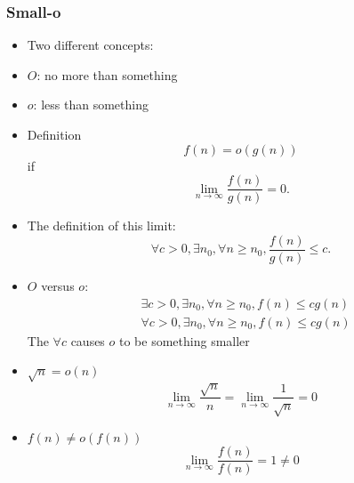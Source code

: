 




\begin{frame}[allowframebreaks] \frametitle{Small-o}
  \begin{itemize}
  \item Two different concepts:

  \item [] $O$: no more than something

  \item [] $o$: less than something
    
\item Definition 
  \begin{equation*}
  f(n)=o(g(n))
\end{equation*}
  if
  \begin{equation*}
    \lim_{n\rightarrow \infty} \frac{f(n)}{g(n)} = 0.
  \end{equation*}
\item The definition of this limit:
\begin{equation*}
  \forall c > 0, \exists n_0, \forall n \geq n_0,
\frac{f(n)}{g(n)} \leq c.
\end{equation*}
\item $O$ versus $o$:
\begin{equation*}
  \begin{split}
&  \exists c > 0, \exists n_0, \forall n \geq n_0,
f(n) \leq c g(n)\\    
&  \forall c > 0, \exists n_0, \forall n \geq n_0,
f(n) \leq c g(n)
\end{split}
\end{equation*}
The $\forall c$ causes $o$ to be something smaller
\item $\sqrt{n}= o(n)$
  \begin{equation*}
    \lim_{n \rightarrow \infty} \frac{\sqrt{n}}{n}
=
   \lim_{n \rightarrow \infty} \frac{1}{\sqrt{n}}=0
  \end{equation*}
\item $f(n) 
\neq o(f(n))$
\begin{equation*}
    \lim_{n \rightarrow \infty} \frac{f(n)}{f(n)} = 1 \neq 0
\end{equation*}

\end{itemize}\end{frame}

